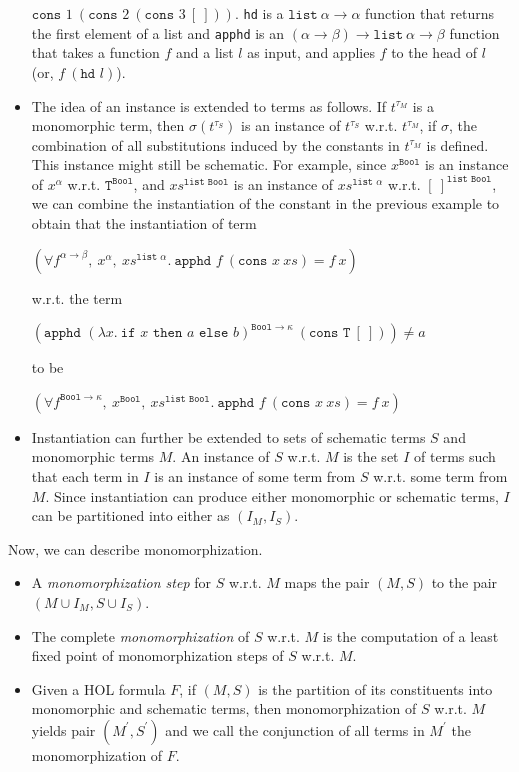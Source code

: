 \documentclass{article}
\begin{document}
\begin{itemize}
		$\texttt{cons }1\ (\texttt{cons }2
		\ (\texttt{cons }3\ [\ ]))$.
		\texttt{hd} is a $\texttt{list}\ 
		\alpha \to \alpha$ function that 
		returns the first element of a list 
		and \texttt{apphd} is an $(\alpha
		\to \beta) \to \texttt{list}\
		\alpha \to \beta$ function that
		takes a function $f$ and a list 
		$l$ as input, and applies $f$
		to the head of $l$ (or, $f\ 
		(\texttt{hd }l)$).
		\item The idea of an instance is 
		extended to terms as follows. If 
		$t^{\tau_M}$ is a monomorphic term, 
		then $\sigma(t^{\tau_S})$ is an instance 
		of $t^{\tau_S}$ w.r.t. $t^{\tau_M}$, if 
		$\sigma$, the combination of all 
		substitutions induced by the 
		constants in $t^{\tau_M}$ is defined. This 
		instance might still be schematic. For 
		example, since $x^{\texttt{Bool}}$ is 
		an instance of $x^{\alpha}$ w.r.t.
		$\texttt{T}^{\texttt{Bool}}$, 
		and $xs^{\texttt{list Bool}}$ is 
		an instance of 
		$xs^{\texttt{list }\alpha}$ 
		w.r.t. $[\ ]^{\texttt{list Bool}}$,
		we can combine the instantiation 
		of the constant in the previous 
		example to obtain that the 
		instantiation of term
		\begin{center}
			$(\forall f^{\alpha \to \beta},\ 
			x^{\alpha},\ xs^{\texttt{list }
				\alpha}.\ \texttt{apphd }f\ 
			(\texttt{cons }x\ xs) = f\ x)$
		\end{center}
		w.r.t. the term
		\begin{center}
			$(\texttt{apphd }(\lambda 
			x.\ \texttt{if }x\texttt{ then }
			a \texttt{ else } b)^{\texttt{Bool} 
				\to \kappa}\ (\texttt{cons T}\ 
			[\ ])) \neq a$
		\end{center}
		to be
		\begin{center}
			$(\forall f^{\texttt{Bool}
				\to \kappa},\ x^{\texttt{Bool}},
			\ xs^{\texttt{list Bool}}.\ 
			\texttt{apphd }f\ (\texttt{cons }x
			\ xs) = f\ x)$
		\end{center}
		\item Instantiation can further be 
		extended to sets of schematic 
		terms $S$ and monomorphic terms $M$. 
		An instance of $S$ w.r.t. 
		$M$ is the set $I$ of terms such 
		that each term in $I$ is an instance 
		of some term from $S$ w.r.t. 
		some term from $M$. Since 
		instantiation can produce either 
		monomorphic or schematic terms, $I$
		can be partitioned into either as
		$(I_M, I_S)$.
	\end{itemize}
	Now, we can describe monomorphization.
	\begin{itemize}
		\item A \textit{monomorphization 
			step} for $S$ w.r.t. $M$ maps 
		the pair $(M,S)$ to the pair 
		$(M \cup I_M, S \cup I_S)$.
		\item The complete 
		\textit{monomorphization} of $S$ 
		w.r.t. $M$ is the computation of 
		a least fixed point of 
		monomorphization steps of $S$ 
		w.r.t. $M$.
		\item Given a HOL formula $F$, 
		if $(M, S)$ is the partition of its 
		constituents into monomorphic and 
		schematic terms, then 
		monomorphization of $S$ 
		w.r.t. $M$ yields pair 
		$(M^{\prime}, S^{\prime})$ and we 
		call the conjunction of all terms in 
		$M^{\prime}$ the monomorphization 
		of $F$.
	\end{itemize}
\end{document}
